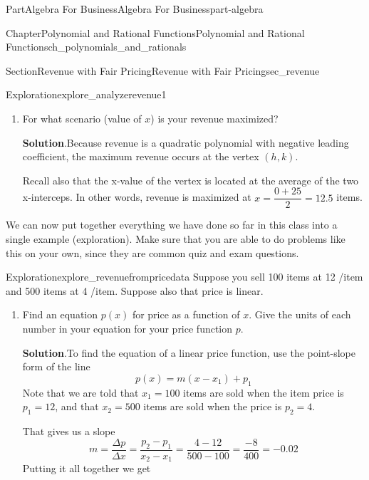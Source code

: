 \documentclass{tufte-book}
\newcommand{\blocktitlefont}{\relax}
\numberwithin{equation}{chapter}
\begin{document}
\begin{partptx}{Part}{Algebra For Business}{}{Algebra For Business}{}{}{part-algebra}
\begin{chapterptx}{Chapter}{Polynomial and Rational Functions}{}{Polynomial and Rational Functions}{}{}{ch_polynomials_and_rationals}
\begin{sectionptx}{Section}{Revenue with Fair Pricing}{}{Revenue with Fair Pricing}{}{}{sec_revenue}
\begin{exploration}{Exploration}{}{explore_analyzerevenue1}
\begin{enumerate}[font=\bfseries,label=(\alph*),ref=\alph*]
\begin{image}{0.25}{0.5}{0.25}{}
{
}%
\end{image}%
\item{}For what scenario (value of \(x\)) is your revenue maximized?%
\par\smallskip%
\noindent\textbf{\blocktitlefont Solution}.\hypertarget{explore_analyzerevenue1-4-2}{}\quad{}Because revenue is a quadratic polynomial with negative leading coefficient, the maximum revenue occurs at the vertex \((h,k)\).%
\par
Recall also that the x-value of the vertex is located at the average of the two x-interceps.  In other words, revenue is maximized at \(x=\dfrac{0+25}{2} = 12.5\) items.%
\end{enumerate}%
\end{exploration}%
We can now put together everything we have done so far in this class into a single example (exploration). Make sure that you are able to do problems like this on your own, since they are common quiz and exam questions.%
\begin{exploration}{Exploration}{}{explore_revenuefrompricedata}%
Suppose you sell 100 items at 12 \textdollar{}\slash{}item and 500 items at 4 \textdollar{}\slash{}item.  Suppose also that price is linear.%
\begin{enumerate}[font=\bfseries,label=(\alph*),ref=\alph*]%
\item{}Find an equation \(p(x)\) for price as a function of \(x\). Give the units of each number in your equation for your price function \(p\).%
\par\smallskip%
\noindent\textbf{\blocktitlefont Solution}.\hypertarget{explore_revenuefrompricedata-2-2}{}\quad{}To find the equation of a linear price function, use the point-slope form of the line%
\begin{equation*}
p(x) = m (x-x_1) + p_1
\end{equation*}
Note that we are told that \(x_1=100\) items are sold when the item price is \(p_1=12\), and that \(x_2=500\) items are sold when the price is \(p_2=4\).%
\par
That gives us a slope%
\begin{equation*}
m = \dfrac{\Delta p}{\Delta x} = \dfrac{p_2-p_1}{x_2-x_1} = \dfrac{4-12}{500-100} = \dfrac{-8}{400} = -0.02
\end{equation*}
Putting it all together we get%
\begin{equation*}

\end{equation*}
\end{enumerate}
\end{exploration}
\end{sectionptx}
\end{chapterptx}
\end{partptx}
\end{document}
